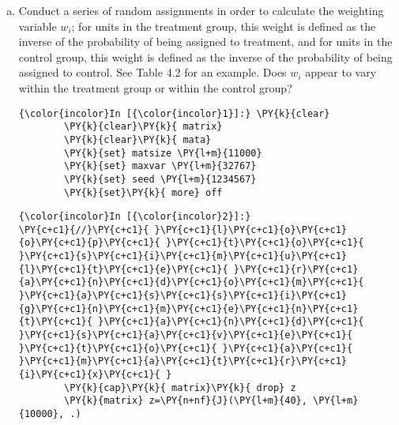 \documentclass[11pt,notitlepage]{article}\usepackage[]{graphicx}\usepackage[]{color}
\makeatletter
\newenvironment{kframe}{%
 \def\at@end@of@kframe{}%
 \ifinner\ifhmode%
  \def\at@end@of@kframe{\end{minipage}}%
  \begin{minipage}{\columnwidth}%
 \fi\fi%
 \def\FrameCommand##1{\hskip\@totalleftmargin \hskip-\fboxsep
 \colorbox{shadecolor}{##1}\hskip-\fboxsep
     \hskip-\linewidth \hskip-\@totalleftmargin \hskip\columnwidth}%
 \MakeFramed {\advance\hsize-\width
   \@totalleftmargin\z@ \linewidth\hsize
   \@setminipage}}%
 {\par\unskip\endMakeFramed%
 \at@end@of@kframe}
\newenvironment{knitrout}{}{} %
\makeatother
\begin{document}
\begin{enumerate}[a)]
\item Conduct a series of random assignments in order to calculate the weighting variable $w_i$; for units in the treatment group, this weight is defined as the inverse of the probability of being assigned to treatment, and for units in the control group, this weight is defined as the inverse of the probability of being assigned to control. See Table 4.2 for an example. Does $w_i$ appear to vary within the treatment group or within the control group?

\begin{knitrout}
\color{fgcolor}\begin{kframe}
    \begin{Verbatim}[commandchars=\\\{\}]
{\color{incolor}In [{\color{incolor}1}]:} \PY{k}{clear}
        \PY{k}{clear}\PY{k}{ matrix}
        \PY{k}{clear}\PY{k}{ mata}
        \PY{k}{set} matsize \PY{l+m}{11000} 
        \PY{k}{set} maxvar \PY{l+m}{32767}
        \PY{k}{set} seed \PY{l+m}{1234567}
        \PY{k}{set}\PY{k}{ more} off
\end{Verbatim}

    \begin{Verbatim}[commandchars=\\\{\}]
{\color{incolor}In [{\color{incolor}2}]:} 
\PY{c+c1}{//}\PY{c+c1}{ }\PY{c+c1}{l}\PY{c+c1}{o}\PY{c+c1}{o}\PY{c+c1}{p}\PY{c+c1}{ }\PY{c+c1}{t}\PY{c+c1}{o}\PY{c+c1}{ }\PY{c+c1}{s}\PY{c+c1}{i}\PY{c+c1}{m}\PY{c+c1}{u}\PY{c+c1}{l}\PY{c+c1}{t}\PY{c+c1}{e}\PY{c+c1}{ }\PY{c+c1}{r}\PY{c+c1}{a}\PY{c+c1}{n}\PY{c+c1}{d}\PY{c+c1}{o}\PY{c+c1}{m}\PY{c+c1}{ }\PY{c+c1}{a}\PY{c+c1}{s}\PY{c+c1}{s}\PY{c+c1}{i}\PY{c+c1}{g}\PY{c+c1}{n}\PY{c+c1}{m}\PY{c+c1}{e}\PY{c+c1}{n}\PY{c+c1}{t}\PY{c+c1}{ }\PY{c+c1}{a}\PY{c+c1}{n}\PY{c+c1}{d}\PY{c+c1}{ }\PY{c+c1}{s}\PY{c+c1}{a}\PY{c+c1}{v}\PY{c+c1}{e}\PY{c+c1}{ }\PY{c+c1}{t}\PY{c+c1}{o}\PY{c+c1}{ }\PY{c+c1}{a}\PY{c+c1}{ }\PY{c+c1}{m}\PY{c+c1}{a}\PY{c+c1}{t}\PY{c+c1}{r}\PY{c+c1}{i}\PY{c+c1}{x}\PY{c+c1}{ }       
        \PY{k}{cap}\PY{k}{ matrix}\PY{k}{ drop} z
        \PY{k}{matrix} z=\PY{n+nf}{J}(\PY{l+m}{40}, \PY{l+m}{10000}, .)
        

\end{Verbatim}
\end{kframe}
\end{knitrout}
\end{enumerate}
\end{document}
